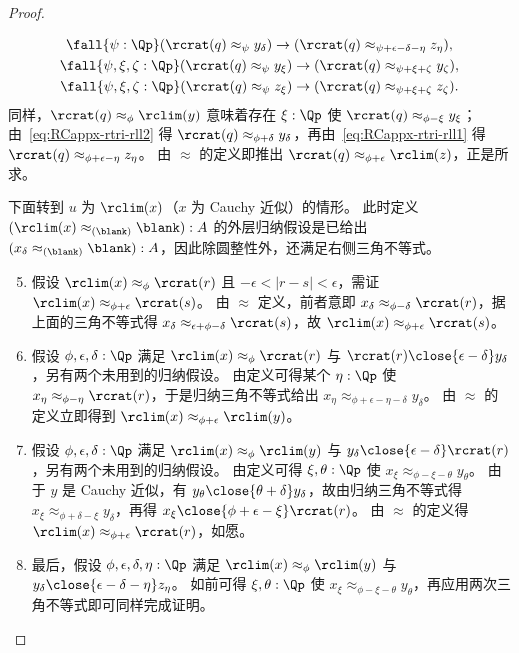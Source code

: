 \begin{proof}
\begin{enumerate}
    \begin{gather}
      \fall{\psi:\Qp}(\rcrat(q) \approx_{\psi} y_\delta) \to (\rcrat(q) \approx_{\psi+\epsilon-\delta-\eta} z_\eta), \label{eq:RCappx-rtri-rll1}\\
      \fall{\psi,\xi,\zeta:\Qp} (\rcrat(q) \approx_{\psi} y_\xi) \to (\rcrat(q) \approx_{\psi+\xi+\zeta} y_\zeta), \label{eq:RCappx-rtri-rll2}\\
      \fall{\psi,\xi,\zeta:\Qp} (\rcrat(q) \approx_{\psi} z_\xi) \to (\rcrat(q) \approx_{\psi+\xi+\zeta} z_\zeta). \label{eq:RCappx-rtri-rll3}
    \end{gather}
    同样，$\rcrat(q)\approx_\phi \rclim(y)$ 意味着存在 $\xi:\Qp$ 使 $\rcrat(q) \approx_{\phi-\xi} y_\xi$；由~\eqref{eq:RCappx-rtri-rll2} 得 $\rcrat(q) \approx_{\phi+\delta} y_\delta$，再由~\eqref{eq:RCappx-rtri-rll1} 得 $\rcrat(q) \approx_{\phi+\epsilon-\eta} z_\eta$。
    由 $\approx$ 的定义即推出 $\rcrat(q) \approx_{\phi+\epsilon} \rclim(z)$，正是所求。
  \end{enumerate}
  下面转到 $u$ 为 $\rclim(x)$（$x$ 为 Cauchy 近似）的情形。
  此时定义 $(\rclim(x) \approx_{(\blank)} {\blank}) : A$ 的外层归纳假设是已给出 ${(x_\delta \approx_{(\blank)} {\blank})}: A$，因此除圆整性外，还满足右侧三角不等式。
  \begin{enumerate}\setcounter{enumi}{4}
  \item 假设 $\rclim(x)\approx_\phi \rcrat(r)$ 且 $-\epsilon<|r-s|<\epsilon$，需证 $\rclim(x)\approx_{\phi+\epsilon} \rcrat(s)$。
    由 $\approx$ 定义，前者意即 $x_\delta \approx_{\phi-\delta} \rcrat(r)$，据上面的三角不等式得 $x_\delta \approx_{\epsilon+\phi-\delta} \rcrat(s)$，故 $\rclim(x)\approx_{\phi+\epsilon} \rcrat(s)$。
  \item 假设 $\phi,\epsilon,\delta:\Qp$ 满足 $\rclim(x)\approx_\phi \rcrat(r)$ 与 $\rcrat(r) \close{\epsilon-\delta} y_\delta$，另有两个未用到的归纳假设。
    由定义可得某个 $\eta:\Qp$ 使 $x_\eta \approx_{\phi-\eta} \rcrat(r)$，于是归纳三角不等式给出 $x_\eta \approx_{\phi+\epsilon-\eta-\delta} y_\delta$。
    由 $\approx$ 的定义立即得到 $\rclim(x) \approx_{\phi+\epsilon} \rclim(y)$。
  \item 假设 $\phi,\epsilon,\delta:\Qp$ 满足 $\rclim(x)\approx_\phi \rclim(y)$ 与 $y_\delta \close{\epsilon-\delta} \rcrat(r)$，另有两个未用到的归纳假设。
    由定义可得 $\xi,\theta:\Qp$ 使 $x_\xi \approx_{\phi-\xi-\theta} y_\theta$。
    由于 $y$ 是 Cauchy 近似，有 $y_\theta \close{\theta+\delta} y_\delta$，故由归纳三角不等式得 $x_\xi \approx_{\phi+\delta-\xi} y_\delta$，再得 $x_\xi \close{\phi+\epsilon-\xi} \rcrat(r)$。
    由 $\approx$ 的定义得 $\rclim(x) \approx_{\phi+\epsilon}\rcrat(r)$，如愿。
  \item 最后，假设 $\phi,\epsilon,\delta,\eta:\Qp$ 满足 $\rclim(x)\approx_\phi \rclim(y)$ 与 $y_\delta \close{\epsilon-\delta-\eta} z_\eta$。
    如前可得 $\xi,\theta:\Qp$ 使 $x_\xi \approx_{\phi-\xi-\theta} y_\theta$，再应用两次三角不等式即可同样完成证明。
  \end{enumerate}


\end{proof}
